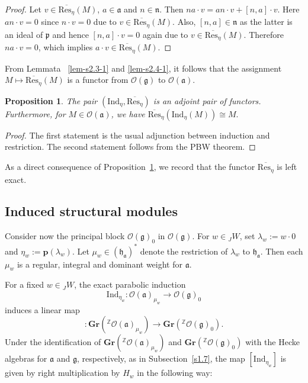 \documentclass[a4paper]{amsart}
\newtheorem{proposition}[theorem]{Proposition}
\begin{document}
\begin{proof}
Let $v\in \overline{\mathrm{Res}_\eta}(M)$,
$a\in\mathfrak{a}$ and $n\in \mathfrak{n}$. Then
$na\cdot v=an\cdot v+ [n,a]\cdot v$. Here $an\cdot v=0$
since $n\cdot v=0$ due to $v\in \overline{\mathrm{Res}_\eta}(M)$.
Also, $[n,a]\in \mathfrak{n}$ as the latter is an ideal of
$\mathfrak{p}$ and hence $[n,a]\cdot v=0$ again due to 
$v\in \overline{\mathrm{Res}_\eta}(M)$. Therefore
$na\cdot v=0$, which implies $a\cdot v\in \overline{\mathrm{Res}_\eta}(M)$.
\end{proof}

From Lemmata ~\ref{lem-s2.3-1} and \ref{lem-s2.4-1}, 
it follows that the assignment
$M\mapsto \overline{\mathrm{Res}_\eta}(M)$ is a functor from
$\mathcal{O}(\mathfrak{g})$ to $\mathcal{O}(\mathfrak{a})$.

\begin{proposition}\label{prop-s2.4-2}
The pair $(\mathrm{Ind}_\eta,\overline{\mathrm{Res}_\eta})$ 
is an adjoint pair of functors. 
Furthermore, for $M\in\mathcal{O}(\mathfrak{a})$,
we have $\overline{\mathrm{Res}}_\eta (\mathrm{Ind}_\eta (M))\cong M.$
\end{proposition}

\begin{proof}
The first statement is the usual adjunction between induction and restriction.
The second statement follows from the PBW theorem. 
\end{proof}

As a direct consequence of Proposition~\ref{prop-s2.4-2}, we record that
the functor $\overline{\mathrm{Res}_\eta}$ is left exact.

\subsection{Induced structural modules}\label{s2.5}

Consider now the principal block 
$\mathcal{O}(\mathfrak{g})_0$ in $\mathcal{O}(\mathfrak{g})$.
For $w\in {}_JW$, set $\lambda_w:=w\cdot 0$ and
$\eta_w:=\mathbf{p}(\lambda_w)$. Let $\mu_w\in(\mathfrak{h}_\mathfrak{a})^*$
denote the restriction of $\lambda_w$ to $\mathfrak{h}_\mathfrak{a}$.
Then each $\mu_w$ is a regular, integral and dominant weight for $\mathfrak{a}$.

For a fixed $w\in {}_JW$, the exact parabolic induction
\begin{displaymath}
\mathrm{Ind}_{\eta_w}:\mathcal{O}(\mathfrak{a})_{\mu_w}
\to \mathcal{O}(\mathfrak{g})_{0}
\end{displaymath}
induces a linear map
\begin{displaymath}
[\mathrm{Ind}_{\eta_w}]:
\mathbf{Gr}({}^\mathbb{Z}\mathcal{O}(\mathfrak{a})_{\mu_w})
\to \mathbf{Gr}({}^\mathbb{Z}\mathcal{O}(\mathfrak{g})_{0}).
\end{displaymath}
Under the identification of $\mathbf{Gr}({}^\mathbb{Z}\mathcal{O}(\mathfrak{a})_{\mu_w})$ and $\mathbf{Gr}({}^\mathbb{Z}\mathcal{O}(\mathfrak{g})_{0})$ with the Hecke algebras for $\mathfrak{a}$
and $\mathfrak{g}$, respectively, as in Subsection~\ref{s1.7},
the map $[\mathrm{Ind}_{\eta_w}]$ is given by right multiplication by
$H_w$ in the following way:
\end{document}

